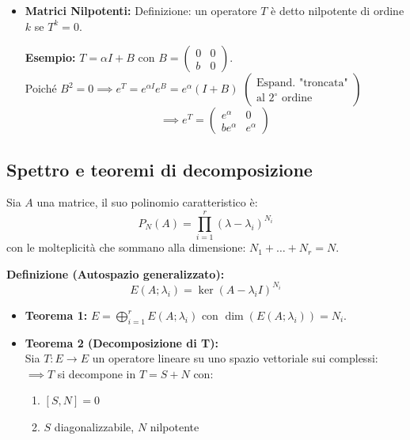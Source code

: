 \documentclass[openany]{book}
\theoremstyle{definition}
\theoremstyle{remark}
\begin{document}
\vspace{0.3cm}
\begin{itemize}
    \item \textbf{Matrici Nilpotenti:} Definizione: un operatore $T$ è detto nilpotente di ordine $k$ se $T^k = 0$.
    
    \textbf{Esempio:} $T = \alpha I + B$ con $B = \begin{pmatrix} 0 & 0 \\ b & 0 \end{pmatrix}$. \\
    Poiché $B^2 = 0 \implies e^T = e^{\alpha I} e^B = e^\alpha (I + B)$ \quad $\left(\substack{\text{Espand. "troncata"} \\ \text{al } 2^\circ \text{ ordine}}\right)$
    \begin{equation*}
        \implies e^T = \begin{pmatrix} e^\alpha & 0 \\ b e^\alpha & e^\alpha \end{pmatrix}
    \end{equation*}
\end{itemize}

\vspace{0.5cm}
\subsection*{Spettro e teoremi di decomposizione}
Sia $A$ una matrice, il suo polinomio caratteristico è:
\begin{equation*}
    P_N(A) = \prod_{i=1}^{r} (\lambda - \lambda_i)^{N_i}
\end{equation*}
con le molteplicità che sommano alla dimensione: $N_1 + \dots + N_r = N$.

\textbf{Definizione (Autospazio generalizzato):}
\begin{equation*}
    E(A; \lambda_i) = \ker (A - \lambda_i I)^{N_i}
\end{equation*}

\begin{itemize}
    \item \textbf{Teorema 1:} $E = \bigoplus_{i=1}^{r} E(A; \lambda_i)$ con $\dim(E(A; \lambda_i)) = N_i$.
    
    \vspace{0.3cm}
    \item \textbf{Teorema 2 (Decomposizione di T):} \\
    Sia $T: E \to E$ un operatore lineare su uno spazio vettoriale sui complessi:
    $\implies T$ si decompone in $T = S + N$ con:
    \begin{enumerate}
        \item $[S, N] = 0$
        \item $S$ diagonalizzabile, $N$ nilpotente
    \end{enumerate}
\end{itemize}
\end{document}
